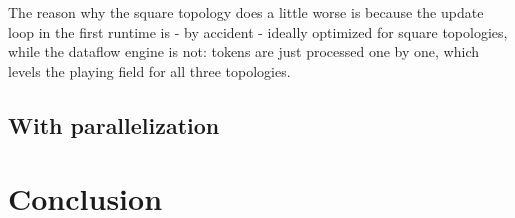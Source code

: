 The reason why the square topology does a little worse is because the update loop in the first runtime is - by accident - ideally optimized for square topologies, while the dataflow engine is not: tokens are just processed one by one, which levels the playing field for all three topologies. 

\subsection{With parallelization}

\section{Conclusion}



